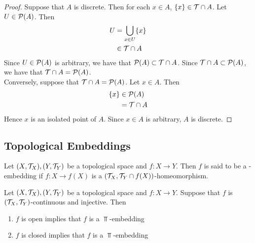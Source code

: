 \documentclass{book}
\begin{document}
\begin{proof}
	Suppose that $A$ is discrete. Then for each $x \in A$, $\{x\} \in \mathcal{T} \cap A$. Let $U \in \mathcal{P}(A)$. Then 
	\begin{align*}
		U
		& = \bigcup_{x \in U} \{x\} \\
		& \in \mathcal{T} \cap A
	\end{align*}
	Since $U \in \mathcal{P}(A)$ is arbitrary, we have that $\mathcal{P}(A) \subset \mathcal{T} \cap A$. Since $\mathcal{T} \cap A \subset \mathcal{P}(A)$, we have that $\mathcal{T} \cap A = \mathcal{P}(A)$. \\
	Conversely, suppose that $\mathcal{T} \cap A = \mathcal{P}(A)$. Let $x \in A$. Then
	\begin{align*}
		\{x\}
		& \in \mathcal{P}(A) \\
		& = \mathcal{T} \cap A
	\end{align*}	
	Hence $x$ is an isolated point of $A$. Since $x \in A$ is arbitrary, $A$ is discrete.
\end{proof}












































\subsection{Topological Embeddings}

\begin{defn} 
	Let $(X, \mathcal{T}_X), (Y, \mathcal{T}_Y)$ be a topological space and $f : X \rightarrow Y$. Then $f$ is said to be a \tbf{$\Top$}-embedding if $f: X \rightarrow f(X)$ is a $(\mathcal{T}_X, \mathcal{T}_Y \cap f(X))$-homeomorphism.
\end{defn}

\begin{ex} 
	Let $(X, \mathcal{T}_X), (Y, \mathcal{T}_Y)$ be a topological space and $f : X \rightarrow Y$. Suppose that $f$ is $(\mathcal{T}_X, \mathcal{T}_Y)$-continuous and injective. Then 
	\begin{enumerate}
		\item $f$ is open implies that $f$ is a $\Top$-embedding
		\item $f$ is closed implies that $f$ is a $\Top$-embedding
	\end{enumerate}
\end{ex}
\end{document}
